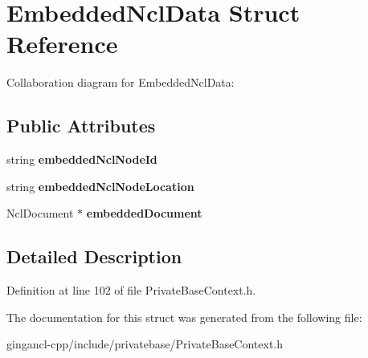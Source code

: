 \section{EmbeddedNclData Struct Reference}
\label{structEmbeddedNclData}
Collaboration diagram for EmbeddedNclData:\subsection*{Public Attributes}
\begin{CompactItemize}
\item 
string {\bf embeddedNclNodeId}\label{structEmbeddedNclData_d4860e7eab21f185220fa38865dc4bf2}

\item 
string {\bf embeddedNclNodeLocation}\label{structEmbeddedNclData_90091f6eca11f95c2e863a75790997e1}

\item 
NclDocument $\ast$ {\bf embeddedDocument}\label{structEmbeddedNclData_fefc377b8d4e067bfae54fbf4ca6cc90}

\end{CompactItemize}


\subsection{Detailed Description}




Definition at line 102 of file PrivateBaseContext.h.

The documentation for this struct was generated from the following file:\begin{CompactItemize}
\item 
gingancl-cpp/include/privatebase/PrivateBaseContext.h\end{CompactItemize}

